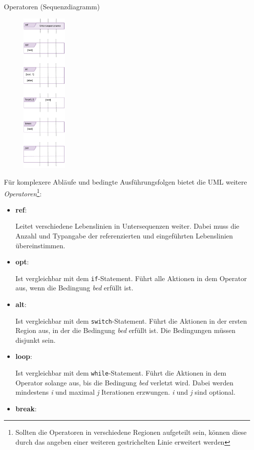 \begin{defi}{Operatoren (Sequenzdiagramm)}
    \begin{figure}
        \centering
        \includegraphics[width=0.2\textwidth]{includes/figures/defi_diagrams_sequenz_operators.pdf}
    \end{figure}
    Für komplexere Abläufe und bedingte Ausführungsfolgen bietet die UML weitere \emph{Operatoren}\footnote{Sollten die Operatoren in verschiedene Regionen aufgeteilt sein, können diese durch das angeben einer weiteren gestrichelten Linie erweitert werden}:
    \begin{itemize}
        \item \textbf{ref}:

              Leitet verschiedene Lebenslinien in Untersequenzen weiter.
              Dabei muss die Anzahl und Typangabe der referenzierten und eingeführten Lebenslinien übereinstimmen.
        \item \textbf{opt}:

              Ist vergleichbar mit dem \texttt{if}-Statement.
              Führt alle Aktionen in dem Operator aus, wenn die Bedingung \emph{bed} erfüllt ist.
        \item \textbf{alt}:

              Ist vergleichbar mit dem \texttt{switch}-Statement.
              Führt die Aktionen in der ersten Region aus, in der die Bedingung \emph{bed} erfüllt ist.
              Die Bedingungen müssen disjunkt sein.
        \item \textbf{loop}:

              Ist vergleichbar mit dem \texttt{while}-Statement.
              Führt die Aktionen in dem Operator solange aus, bis die Bedingung \emph{bed} verletzt wird.
              Dabei werden mindestens \emph{i} und maximal \emph{j} Iterationen erzwungen.
              \emph{i} und \emph{j} sind optional.
        \item \textbf{break}:


\end{itemize}
\end{defi}
